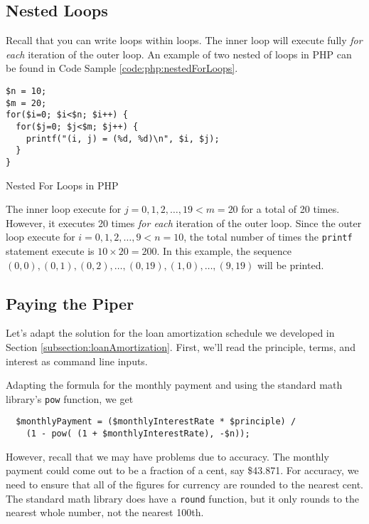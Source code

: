 \subsection{Nested Loops}

Recall that you can write loops within loops.  The inner loop will execute fully 
\emph{for each} iteration of the outer loop.  An example of two nested of
loops in PHP can be found in Code Sample \ref{code:php:nestedForLoops}.

\begin{listing}[H]
\begin{verbatim}
$n = 10;
$m = 20;
for($i=0; $i<$n; $i++) {
  for($j=0; $j<$m; $j++) {
    printf("(i, j) = (%d, %d)\n", $i, $j);
  }
}
\end{verbatim}
  \caption{Nested For Loops in PHP}
  \label{code:php:nestedForLoops}
\end{listing}

The inner loop execute for $j = 0, 1, 2, \ldots, 19 < m = 20$ for a total
of 20 times.  However, it executes 20 times \emph{for each} iteration of
the outer loop.  Since the outer loop execute for $i = 0, 1, 2, \ldots, 9 < n = 10$, 
the total number of times the \texttt{printf} statement execute is
$10 \times 20 = 200$.  In this example, the sequence $(0, 0), (0, 1), (0, 2), \ldots, (0,19), (1, 0), \ldots, (9, 19)$
will be printed.

\subsection{Paying the Piper}

Let's adapt the solution for the loan amortization schedule we developed in 
Section \ref{subsection:loanAmortization}.  First, we'll read the principle, 
terms, and interest as command line inputs.

Adapting the formula for the monthly payment and using the standard
math library's \texttt{pow} function, we get

\begin{verbatim}
  $monthlyPayment = ($monthlyInterestRate * $principle) / 
  	(1 - pow( (1 + $monthlyInterestRate), -$n));
\end{verbatim}

However, recall that we may have problems due to accuracy.  The monthly
payment could come out to be a fraction of a cent, say \$43.871.  For 
accuracy, we need to ensure that all of the figures for currency are rounded
to the nearest cent.  The standard math library does have a \texttt{round}
function, but it only rounds to the nearest whole number, not the nearest
100th.

